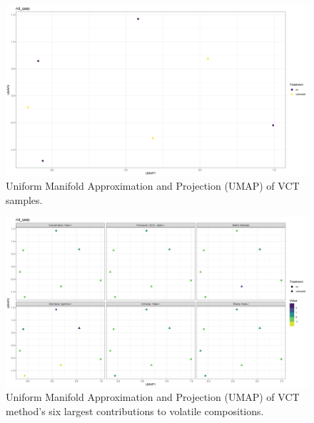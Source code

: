 \documentclass[12pt,final,CPage]{ufthesis}
\begin{document}
{\begin{figure}
  {\centering \includegraphics[width=1\linewidth]{figure/rrv_volatiles_umap_rrd_qsep} 

  }

  \caption{Uniform Manifold Approximation and Projection (UMAP) of VCT samples.}\label{fig:qsep-vocs-umap}
  \end{figure}
  \begin{figure}

  {\centering \includegraphics[width=1\linewidth]{figure/rrv_volatiles_umap_chems_rrd_qsep} 

  }

  \caption{Uniform Manifold Approximation and Projection (UMAP) of VCT method's six largest contributions to volatile compositions.}\label{fig:qsep-vocs-umap-chems}
  \end{figure}
  \begin{table}


\end{table}}
\end{document}
